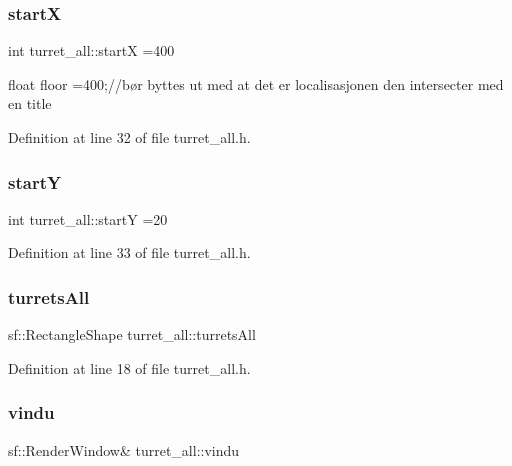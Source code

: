 \hypertarget{classturret__all_a18ee683d7bedabba67601c9450082ea2}{}\label{classturret__all_a18ee683d7bedabba67601c9450082ea2} 
\subsubsection{\texorpdfstring{startX}{startX}}
{\footnotesize\ttfamily int turret\+\_\+all\+::startX =400}



float floor =400;//bør byttes ut med at det er localisasjonen den intersecter med en title 



Definition at line 32 of file turret\+\_\+all.\+h.

\hypertarget{classturret__all_a31a66435d667c04c7fa3d72be64c1630}{}\label{classturret__all_a31a66435d667c04c7fa3d72be64c1630} 
\subsubsection{\texorpdfstring{startY}{startY}}
{\footnotesize\ttfamily int turret\+\_\+all\+::startY =20}



Definition at line 33 of file turret\+\_\+all.\+h.

\hypertarget{classturret__all_a63e89be682fc405614dcd683b4771459}{}\label{classturret__all_a63e89be682fc405614dcd683b4771459} 
\subsubsection{\texorpdfstring{turrets\+All}{turretsAll}}
{\footnotesize\ttfamily sf\+::\+Rectangle\+Shape turret\+\_\+all\+::turrets\+All}



Definition at line 18 of file turret\+\_\+all.\+h.

\hypertarget{classturret__all_a7a5259aab37af1c5398ba52708261bf4}{}\label{classturret__all_a7a5259aab37af1c5398ba52708261bf4} 
\subsubsection{\texorpdfstring{vindu}{vindu}}
{\footnotesize\ttfamily sf\+::\+Render\+Window\& turret\+\_\+all\+::vindu}



